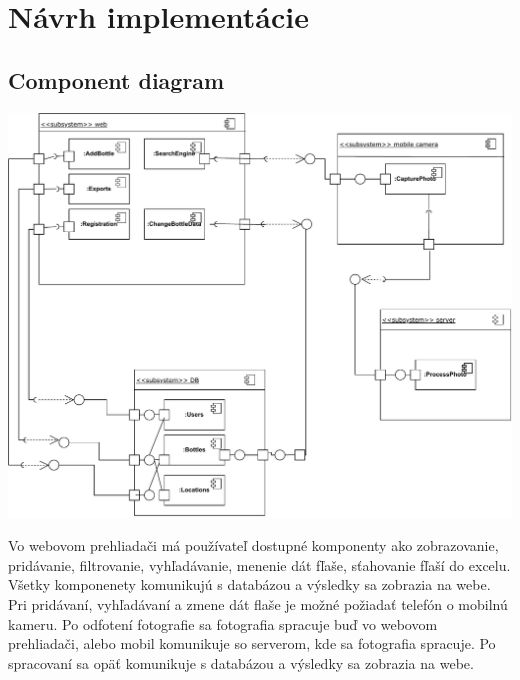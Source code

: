 \documentclass{zah}
\begin{document}
\section{Návrh implementácie}

\subsection{Component diagram}
\includegraphics[width=\textwidth]{navrh-assets/component}

Vo webovom prehliadači má používateľ dostupné komponenty ako zobrazovanie, pridávanie,
filtrovanie, vyhľadávanie, menenie dát fľaše, sťahovanie fľaší do excelu. Všetky
komponenety komunikujú s databázou a výsledky sa zobrazia na webe. Pri pridávaní,
vyhľadávaní a zmene dát flaše je možné požiadať telefón o mobilnú kameru.
Po odfotení fotografie sa fotografia spracuje buď vo webovom prehliadači, alebo mobil
komunikuje so serverom, kde sa fotografia spracuje. Po spracovaní sa opäť komunikuje
s databázou a výsledky sa zobrazia na webe.
\end{document}
